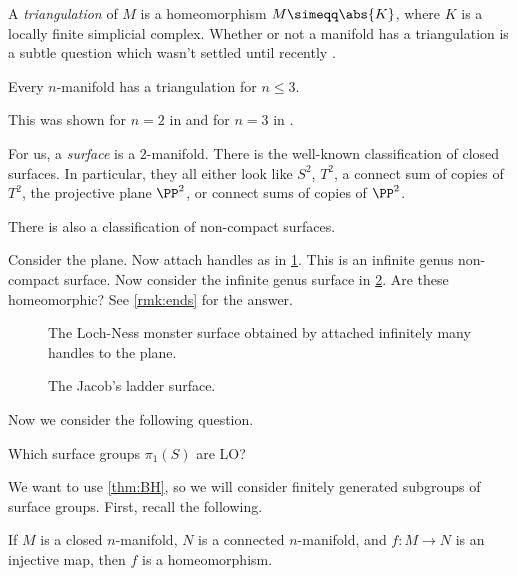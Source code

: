A \emph{triangulation} of $M$ is a homeomorphism $M\simeqq \abs{K}$, where $K$
is a locally finite simplicial complex.
Whether or not a manifold has a triangulation is a subtle 
question which wasn't settled until recently \cite{man}.

\begin{fact}
Every $n$-manifold has a triangulation for $n\leq 3$.
\end{fact}
This was shown for $n = 2$ in \cite{rado} and for $n=3$ in \cite{moise}.

For us, a \emph{surface} is a $2$-manifold.
There is the well-known classification of closed surfaces. 
In particular, they all either look like $S^2$, $T^2$, a connect sum of copies of $T^2$,
the projective plane $\PP^2$, or connect sums of copies of $\PP^2$.

There is also a classification of non-compact surfaces.

\begin{exm}
Consider the plane. Now attach handles as in \cref{fig:loch}.
This is an infinite genus non-compact surface.
Now consider the infinite genus surface in \cref{fig:jacob}. 
Are these homeomorphic?
See \cref{rmk:ends} for the answer.

\begin{figure}
\begin{overlay}
\end{overlay}
\caption{The Loch-Ness monster surface obtained by attached infinitely many handles to the
plane.}
\label{fig:loch}
\end{figure}

\begin{figure}
\begin{overlay}
\end{overlay}
\caption{The Jacob's ladder surface.}
\label{fig:jacob}
\end{figure}
\label{exm:loch_jacob}
\end{exm}

Now we consider the following question.
\begin{qn}
Which surface groups $\pi_1\left(S\right)$ are LO?
\end{qn}

We want to use \cref{thm:BH}, so 
we will consider finitely generated subgroups of surface groups.
First, recall the following.

\begin{lem}
If $M$ is a closed $n$-manifold, $N$ is a connected $n$-manifold, and $f : M\to N$ is an
injective map, then $f$ is a homeomorphism.
\label{lem:2.14}
\end{lem}

